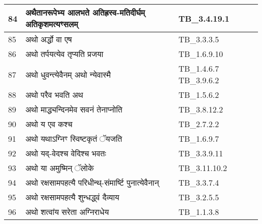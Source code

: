 \documentclass[17pt]{extarticle}
\begin{document}
\begin{longtable}{||p{0.4in}||p{4.9in}||p{0.9in}||}
    84 & अथैतानरूपेभ्य आलभते अतिह्रस्व{-}मतिदीर्घम् अतिकृशमत्यꣳसलम् & TB\_3.4.19.1       \\
    
    \hline
        
    85 & अथो अर्द्धो वा एष & TB\_3.3.3.5       \\
    
    \hline
        
    86 & अथो तर्पयत्येव तृप्यति प्रजया & TB\_1.6.9.10       \\
    
    \hline
        
    87 & अथो धुवन्त्येवैनम् अथो न्येवास्मै & TB\_1.4.6.7 TB\_3.9.6.2       \\
    
    \hline
        
    88 & अथो परैव भवति अथ & TB\_1.5.6.2       \\
    
    \hline
        
    89 & अथो माद्ध्यन्दिनमेव सवनं तेनाप्नोति & TB\_3.8.12.2       \\
    
    \hline
        
    90 & अथो य एव कश्च & TB\_2.7.2.2       \\
    
    \hline
        
    91 & अथो यथाऽग्निꣳ स्विष्टकृतं ॅयजति & TB\_1.6.9.7       \\
    
    \hline
        
    92 & अथो यद्{-}वेदश्च वेदिश्च भवतः & TB\_3.3.9.11       \\
    
    \hline
        
    93 & अथो या अमुष्मिन् ॅलोके & TB\_3.11.10.2       \\
    
    \hline
        
    94 & अथो रक्षसामपहत्यै परिधीन्थ्{-}संमार्ष्टि पुनात्येवैनान् & TB\_3.3.7.4       \\
    
    \hline
        
    95 & अथो रक्षसामपहत्यै शुन्धद्ध्वं दैव्याय & TB\_3.2.5.5       \\
    
    \hline
        
    96 & अथो शत्वांय सरेता अग्निराधेय & TB\_1.1.3.8       \\
    

\end{longtable}
\end{document}
